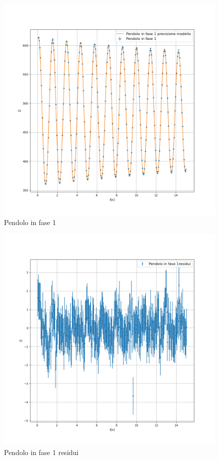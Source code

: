 \documentclass{article}
\begin{document}
            \begin{figure}[h! ]
                \centering
                \includegraphics[width=1\linewidth]{Pendolo in fase 1.png}
                \caption{Pendolo in fase 1}
                \label{fig:pf}
            \end{figure}
            
            \begin{figure}[h! ]
                \centering
                \includegraphics[width=1\linewidth]{Pendolo in fase 1_residuals.png}
                \caption{Pendolo in fase 1 residui}
                \label{fig:pfres}
            \end{figure}
\end{document}
